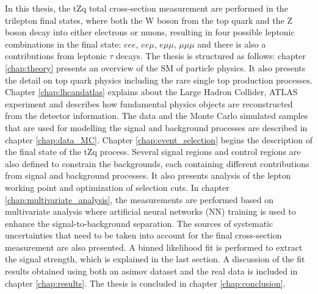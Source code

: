 In this thesis, the tZq total cross-section measurement are performed in the trilepton final states, where both the W boson from the top quark and the Z boson decay into either electrons or muons, resulting in four possible leptonic combinations in the final state: $eee$, $ee\mu$, $e\mu\mu$, $\mu\mu\mu$ and there is also a contributions from leptonic $\tau$ decays. The thesis is structured as follows: chapter \ref{chap:theory} presents an overview of the SM of particle physics. It also presents the detail on top quark physics including the rare single top production processes. Chapter \ref{chap:lhcandatlas} explains about the Large Hadron Collider, ATLAS experiment and describes how fundamental physics objects are reconstructed from the detector information. The data and the Monte Carlo simulated samples that are used for modelling the signal and background processes are described in chapter \ref{chap:data_MC}. Chapter \ref{chap:event_selection} begins the description of the final state of the tZq process. Several signal regions and control regions are also defined to constrain the backgrounds, each containing different contributions from signal and background processes. It also  presents analysis of the lepton working point and optimization of selection cuts. In chapter \ref{chap:multivariate_analysis}, the measurements are performed based on multivariate analysis where artificial neural networks (NN) training is used to enhance the signal-to-background separation. The sources of systematic uncertainties that need to be taken into account for the final cross-section measurement are also presented. A binned likelihood fit is performed to extract the signal strength, which is explained in the last section. A discussion of the fit results obtained using both an asimov dataset and the real data is included in chapter \ref{chap:results}. The thesis is concluded in chapter \ref{chap:conclusion}.
